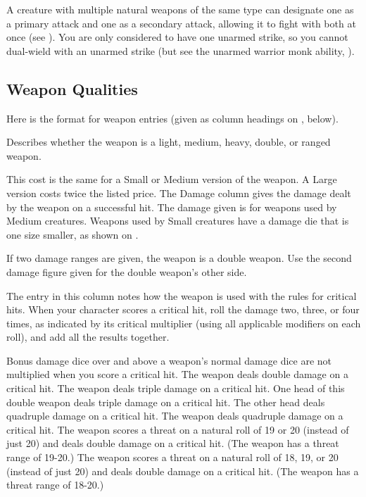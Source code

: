 A creature with multiple natural weapons of the same type can designate one as a primary attack and one as a secondary attack, allowing it to fight with both at once (see ). You are only considered to have one unarmed strike, so you cannot dual-wield with an unarmed strike (but see the unarmed warrior monk ability, ).

\subsection{Weapon Qualities}
Here is the format for weapon entries (given as column headings on , below).

 Describes whether the weapon is a light, medium, heavy, double, or ranged weapon.

\par This cost is the same for a Small or Medium version of the weapon. A Large version costs twice the listed price.
 The Damage column gives the damage dealt by the weapon on a successful hit. The damage given is for weapons used by Medium creatures. Weapons used by Small creatures have a damage die that is one size smaller, as shown on .

If two damage ranges are given, the weapon is a double weapon. Use the second damage figure given for the double weapon's other side.

 The entry in this column notes how the weapon is used with the rules for critical hits. When your character scores a critical hit, roll the damage two, three, or four times, as indicated by its critical multiplier (using all applicable modifiers on each roll), and add all the results together.

 Bonus damage dice over and above a weapon's normal damage dice are not multiplied when you score a critical hit.
 The weapon deals double damage on a critical hit.
 The weapon deals triple damage on a critical hit.
 One head of this double weapon deals triple damage on a critical hit. The other head deals quadruple damage on a critical hit.
 The weapon deals quadruple damage on a critical hit.
 The weapon scores a threat on a natural roll of 19 or 20 (instead of just 20) and deals double damage on a critical hit. (The weapon has a threat range of 19-20.)
 The weapon scores a threat on a natural roll of 18, 19, or 20 (instead of just 20) and deals double damage on a critical hit. (The weapon has a threat range of 18-20.)

